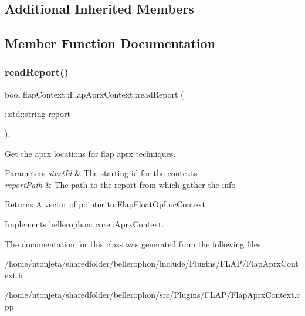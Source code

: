 \subsection*{Additional Inherited Members}


\subsection{Member Function Documentation}
\hypertarget{classbellerophon_1_1flapContext_1_1FlapAprxContext_a3198868b5a8708c4976db9f1a70e70d5}{}\label{classbellerophon_1_1flapContext_1_1FlapAprxContext_a3198868b5a8708c4976db9f1a70e70d5} 
\subsubsection{\texorpdfstring{read\+Report()}{readReport()}}
{\footnotesize\ttfamily bool flap\+Context\+::\+Flap\+Aprx\+Context\+::read\+Report (\begin{DoxyParamCaption}\item[{\+::std\+::string}]{report }\end{DoxyParamCaption})\hspace{0.3cm}{\ttfamily [override]}, {\ttfamily [virtual]}}



Get the aprx locations for flap aprx techniques. 


\begin{DoxyParams}{Parameters}
{\em start\+Id} & The starting id for the contexts \\
\hline
{\em report\+Path} & The path to the report from which gather the info \\
\hline
\end{DoxyParams}
\begin{DoxyReturn}{Returns}
A vector of pointer to Flap\+Float\+Op\+Loc\+Context 
\end{DoxyReturn}


Implements \hyperlink{classbellerophon_1_1core_1_1AprxContext_a6f7863e6f7d7146807247dca43a5af28}{bellerophon\+::core\+::\+Aprx\+Context}.



The documentation for this class was generated from the following files\+:\begin{DoxyCompactItemize}
\item 
/home/ntonjeta/sharedfolder/bellerophon/include/\+Plugins/\+F\+L\+A\+P/Flap\+Aprx\+Context.\+h\item 
/home/ntonjeta/sharedfolder/bellerophon/src/\+Plugins/\+F\+L\+A\+P/Flap\+Aprx\+Context.\+cpp\end{DoxyCompactItemize}
